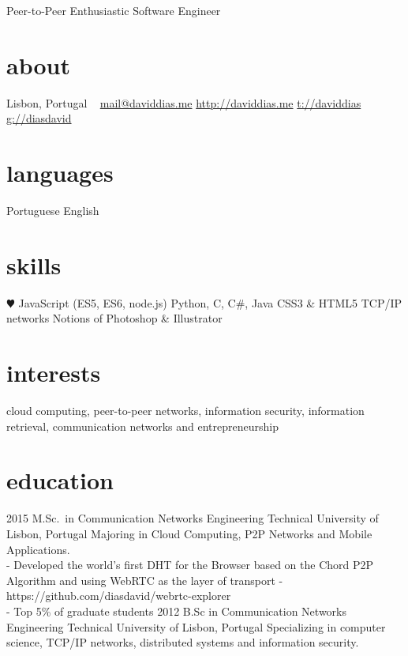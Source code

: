 \documentclass[]{friggeri-cv}
\begin{document}
       {Peer-to-Peer Enthusiastic Software Engineer}

\begin{aside}
  \section{about}
    Lisbon, Portugal
    ~
    \href{mailto:mail@daviddias.me}{mail@daviddias.me}
    \href{http://daviddias.me}{http://daviddias.me}
    \href{https://twitter.com/daviddias}{t://daviddias}
    \href{https://github.com/diasdavid}{g://diasdavid}
  \section{languages}
    Portuguese
    English
  \section{skills}
    {\color{red} $\varheartsuit$} JavaScript
    (ES5, ES6, node.js)
    Python, C, C\#, Java
    CSS3 \& HTML5
    TCP/IP networks
    Notions of Photoshop \& Illustrator
\end{aside}

\section{interests}

cloud computing, peer-to-peer networks, information security, information retrieval, communication networks and entrepreneurship

\section{education}

\begin{entrylist}
  \entry
    {2015}
    {M.Sc.\ in Communication Networks Engineering}
    {Technical University of Lisbon, Portugal}
    {Majoring in Cloud Computing, P2P Networks and Mobile Applications. \\
        - Developed the world's first DHT for the Browser based on the Chord P2P Algorithm and using WebRTC as the layer of transport - https://github.com/diasdavid/webrtc-explorer\\
        - Top 5\% of graduate students}
  \entry
    {2012}
    {B.Sc in Communication Networks Engineering}
    {Technical University of Lisbon, Portugal}
    {Specializing in computer science, TCP/IP networks, distributed systems and information security.}
\end{entrylist}
\end{document}
